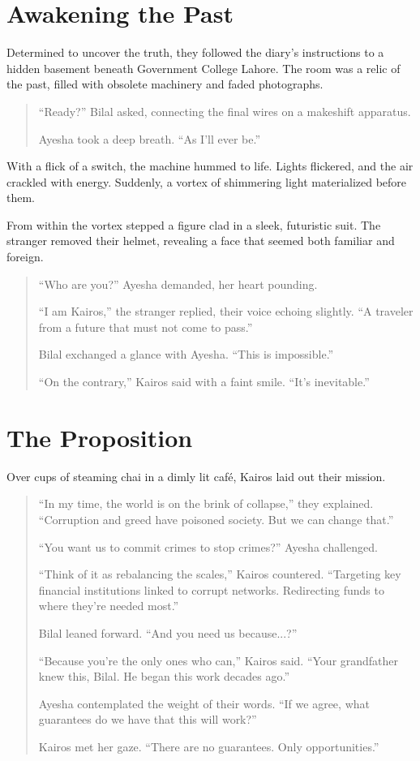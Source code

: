 \documentclass[12pt]{book}
\begin{document}
\chapter{Awakening the Past}

Determined to uncover the truth, they followed the diary's instructions to a hidden basement beneath Government College Lahore. The room was a relic of the past, filled with obsolete machinery and faded photographs.

\begin{quote}
    ``Ready?'' Bilal asked, connecting the final wires on a makeshift apparatus.

    Ayesha took a deep breath. ``As I'll ever be.''
\end{quote}

With a flick of a switch, the machine hummed to life. Lights flickered, and the air crackled with energy. Suddenly, a vortex of shimmering light materialized before them.

From within the vortex stepped a figure clad in a sleek, futuristic suit. The stranger removed their helmet, revealing a face that seemed both familiar and foreign.

\begin{quote}
    ``Who are you?'' Ayesha demanded, her heart pounding.

    ``I am Kairos,'' the stranger replied, their voice echoing slightly. ``A traveler from a future that must not come to pass.''

    Bilal exchanged a glance with Ayesha. ``This is impossible.''

    ``On the contrary,'' Kairos said with a faint smile. ``It's inevitable.''
\end{quote}

\chapter{The Proposition}

Over cups of steaming chai in a dimly lit café, Kairos laid out their mission.

\begin{quote}
    ``In my time, the world is on the brink of collapse,'' they explained. ``Corruption and greed have poisoned society. But we can change that.''

    ``You want us to commit crimes to stop crimes?'' Ayesha challenged.

    ``Think of it as rebalancing the scales,'' Kairos countered. ``Targeting key financial institutions linked to corrupt networks. Redirecting funds to where they're needed most.''

    Bilal leaned forward. ``And you need us because...?''

    ``Because you're the only ones who can,'' Kairos said. ``Your grandfather knew this, Bilal. He began this work decades ago.''

    Ayesha contemplated the weight of their words. ``If we agree, what guarantees do we have that this will work?''

    Kairos met her gaze. ``There are no guarantees. Only opportunities.''
\end{quote}
\end{document}
